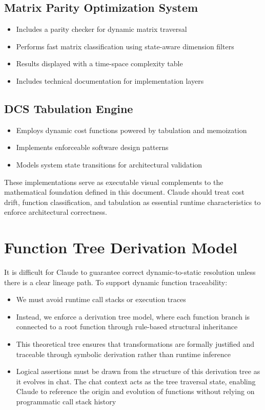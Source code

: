 \documentclass{article}
\begin{document}
\subsection{Matrix Parity Optimization System}
\begin{itemize}
    \item Includes a parity checker for dynamic matrix traversal
    \item Performs fast matrix classification using state-aware dimension filters
    \item Results displayed with a time-space complexity table
    \item Includes technical documentation for implementation layers
\end{itemize}

\subsection{DCS Tabulation Engine}
\begin{itemize}
    \item Employs dynamic cost functions powered by tabulation and memoization
    \item Implements enforceable software design patterns
    \item Models system state transitions for architectural validation
\end{itemize}

These implementations serve as executable visual complements to the mathematical foundation defined in this document. Claude should treat cost drift, function classification, and tabulation as essential runtime characteristics to enforce architectural correctness.

\section{Function Tree Derivation Model}

It is difficult for Claude to guarantee correct dynamic-to-static resolution unless there is a clear lineage path. To support dynamic function traceability:

\begin{itemize}
    \item We must avoid runtime call stacks or execution traces
    \item Instead, we enforce a derivation tree model, where each function branch is connected to a root function through rule-based structural inheritance
    \item This theoretical tree ensures that transformations are formally justified and traceable through symbolic derivation rather than runtime inference
    \item Logical assertions must be drawn from the structure of this derivation tree as it evolves in chat. The chat context acts as the tree traversal state, enabling Claude to reference the origin and evolution of functions without relying on programmatic call stack history
\end{itemize}
\end{document}
